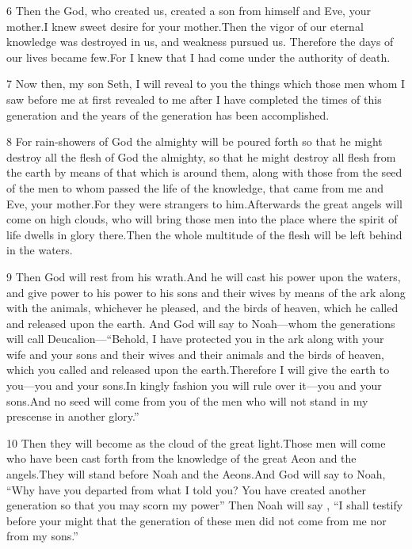 \par 6 Then the God, who created us, created a son from himself and Eve, your mother.I knew sweet desire for your mother.Then the vigor of our eternal knowledge was destroyed in us, and weakness pursued us. Therefore the days of our lives became few.For I knew that I had come under the authority of death.

\par 7 Now then, my son Seth, I will reveal to you the things which those men whom I saw before me at first revealed to me after I have completed the times of this generation and the years of the generation has been accomplished.

\par 8 For rain-showers of God the almighty will be poured forth so that he might destroy all the flesh of God the almighty, so that he might destroy all flesh from the earth by means of that which is around them, along with those from the seed of the men to whom passed the life of the knowledge, that came from me and Eve, your mother.For they were strangers to him.Afterwards the great angels will come on high clouds, who will bring those men into the place where the spirit of life dwells in glory there.Then the whole multitude of the flesh will be left behind in the waters.

\par 9 Then God will rest from his wrath.And he will cast his power upon the waters, and give power to his power to his sons and their wives by means of the ark along with the animals, whichever he pleased, and the birds of heaven, which he called and released upon the earth. And God will say to Noah—whom the generations will call Deucalion—“Behold, I have protected you in the ark along with your wife and your sons and their wives and their animals and the birds of heaven, which you called and released upon the earth.Therefore I will give the earth to you—you and your sons.In kingly fashion you will rule over it—you and your sons.And no seed will come from you of the men who will not stand in my prescense in another glory.”

\par 10 Then they will become as the cloud of the great light.Those men will come who have been cast forth from the knowledge of the great Aeon and the angels.They will stand before Noah and the Aeons.And God will say to Noah, “Why have you departed from what I told you? You have created another generation so that you may scorn my power” Then Noah will say , “I shall testify before your might that the generation of these men did not come from me nor from my sons.”

